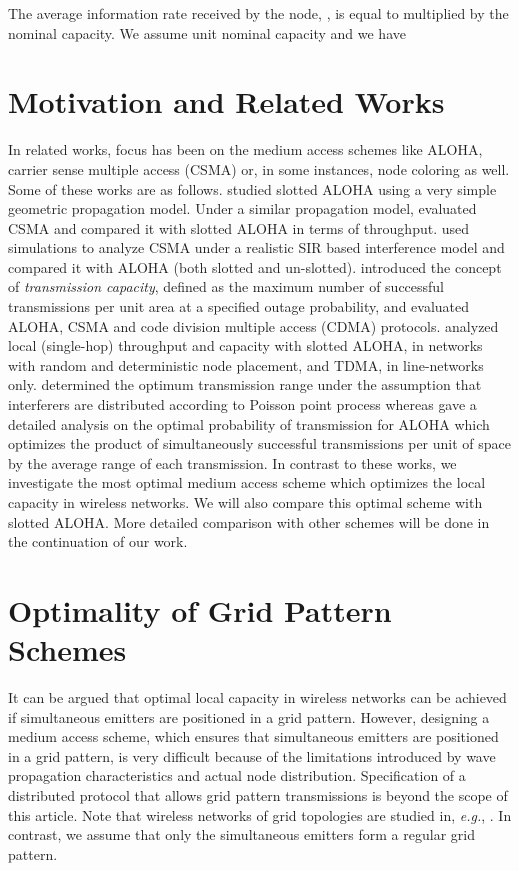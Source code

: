 \documentclass[12pt,english]{article}
\begin{document}
The average information rate received by the node, , is equal to  multiplied by the nominal capacity. We assume unit nominal capacity and we have 


\section{Motivation and Related Works}
\label{sec:context}

In related works, focus has been on the medium access schemes like ALOHA, carrier sense multiple access (CSMA) or, in some instances, node coloring as well. Some of these works are as follows. \cite{Nelson:Kleinrock} studied slotted ALOHA using a very simple geometric propagation model. Under a similar propagation model, \cite{CSMA} evaluated CSMA and compared it with slotted ALOHA in terms of throughput. \cite{Bartek} used simulations to analyze CSMA under a realistic SIR based interference model and compared it with ALOHA (both slotted and un-slotted). \cite{Weber,Weber2,Weber3} introduced the concept of {\em transmission capacity}, defined as the maximum number of successful transmissions per unit area at a specified outage probability, and evaluated ALOHA, CSMA and code division multiple access (CDMA) protocols. \cite{Haenggi} analyzed local (single-hop) throughput and capacity with slotted ALOHA, in networks with random and deterministic node placement, and TDMA, in  line-networks only. \cite{Zorzi2} determined the optimum transmission range under the assumption that interferers are distributed according to Poisson point process whereas \cite{SR-ALOHA} gave a detailed analysis on the optimal probability of transmission for ALOHA which optimizes the product of simultaneously successful transmissions per unit of space by the average range of each transmission. In contrast to these works, we investigate the most optimal medium access scheme which optimizes the local capacity in wireless networks. We will also compare this optimal scheme with slotted ALOHA. More detailed comparison with other schemes will be done in the continuation of our work.
 
\section{Optimality of Grid Pattern Schemes}
\label{sec:grid_optimality}

It can be argued that optimal local capacity in wireless networks can be achieved if simultaneous emitters are positioned in a grid pattern. However, designing a medium access scheme, which ensures that simultaneous emitters are positioned in a grid pattern, is very difficult because of the limitations introduced by wave propagation characteristics and actual node distribution. Specification of a distributed protocol that allows grid pattern transmissions is beyond the scope of this article. Note that wireless networks of grid topologies are studied in, {\it e.g.}, \cite{Liu:Haenggi,Hong:Hua}. In contrast, we assume that only the simultaneous emitters form a regular grid pattern. 
\end{document}
